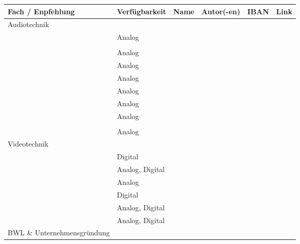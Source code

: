 \begin{table}[]
\centering
\begin{tabular}{|l|l|l|l|l|l|}
\hline
Fach / Enpfehlung           & Verfügbarkeit   & Name & Autor(-en) & IBAN & Link \\ \hline
Audiotechnik                &                 &      &            &      &      \\ \hline
                            & Analog          &      &            &      &      \\
                            &                 &      &            &      &      \\
                            & Analog          &      &            &      &      \\
                            & Analog          &      &            &      &      \\
                            & Analog          &      &            &      &      \\
                            & Analog          &      &            &      &      \\
                            & Analog          &      &            &      &      \\
                            & Analog          &      &            &      &      \\
                            &                 &      &            &      &      \\
                            & Analog          &      &            &      &      \\ \hline
Videotechnik                &                 &      &            &      &      \\ \hline
                            & Digital         &      &            &      &      \\
                            & Analog, Digital &      &            &      &      \\
                            & Analog          &      &            &      &      \\
                            & Digital         &      &            &      &      \\
                            & Analog, Digital &      &            &      &      \\
                            & Analog, Digital &      &            &      &      \\ \hline
BWL \& Unternehmensgründung &                 &      &            &      &      \\ \hline

\end{tabular}
\end{table}

